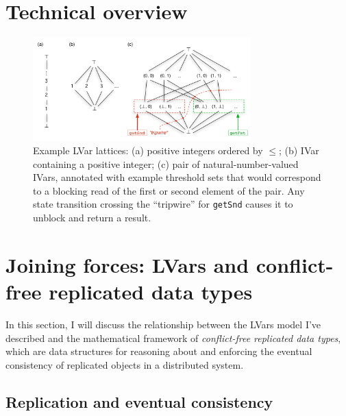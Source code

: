 \documentclass{article}
\begin{document}
\section{Technical overview}\label{s:technical-overview}


\begin{figure}
\centering
\includegraphics[width=0.75\textwidth]{figures/example-lvar-lattices.pdf} 
  \caption{Example LVar lattices: (a) positive integers ordered by
    $\leq$; (b) IVar containing a positive integer; (c) pair of
    natural-number-valued IVars, annotated with example threshold sets
    that would correspond to a blocking read of the first or second
    element of the pair.  Any state transition crossing the
    ``tripwire'' for \lstinline{getSnd} causes it to unblock and
    return a result.}

  \label{f:lattice-examples}
\end{figure}

\section{Joining forces: LVars and conflict-free replicated data types}\label{s:crdts}

In this section, I will discuss the relationship between the LVars
model I've described and the mathematical framework of
\emph{conflict-free replicated data types}, which are data structures
for reasoning about and enforcing the eventual consistency of
replicated objects in a distributed system.

\subsection{Replication and eventual consistency}
\end{document}
